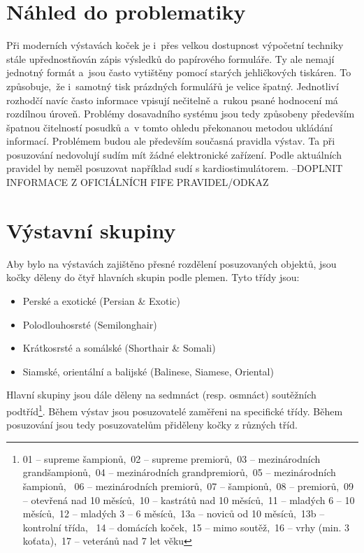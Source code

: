 \documentclass[11pt, oneside]{fithesis2}
\begin{document}
\section{Náhled do problematiky}
Při moderních výstavách koček je i~přes velkou dostupnost výpočetní techniky stále upřednostňován zápis výsledků do papírového formuláře.
Ty ale nemají jednotný formát a~jsou často vytištěny pomocí starých jehličkových tiskáren.
To způsobuje,~že i~samotný tisk prázdných formulářů je velice špatný. Jednotliví rozhodčí navíc často informace vpisují nečitelně a~rukou psané hodnocení má rozdílnou úroveň. Problémy dosavadního systému jsou tedy
způsobeny především špatnou čitelností posudků a~v tomto ohledu překonanou metodou ukládání informací.
\linebreak
Problémem budou ale především současná pravidla výstav. Ta při posuzování nedovolují sudím mít žádné elektronické zařízení. Podle aktuálních pravidel by neměl posuzovat například sudí s kardiostimulátorem. --DOPLNIT INFORMACE Z OFICIÁLNÍCH FIFE PRAVIDEL/ODKAZ

\section{Výstavní skupiny}
Aby bylo na výstavách zajištěno přesné rozdělení posuzovaných objektů, jsou kočky děleny do čtyř hlavních skupin podle plemen.
Tyto třídy jsou:
\begin{itemize}
 \item Perské a exotické (Persian \& Exotic)
 \item Polodlouhosrsté (Semilonghair)
 \item Krátkosrsté a somálské (Shorthair \& Somali)
 \item Siamské, orientální a balijské (Balinese, Siamese, Oriental)
\end{itemize}
Hlavní skupiny jsou dále děleny na sedmnáct (resp. osmnáct) soutěžních podtříd\footnote {01 -- supreme šampionů,~02 -- supreme premiorů,~03 -- mezinárodních grandšampionů,~04 -- mezinárodních grandpremiorů,~05 -- mezinárodních šampionů,
~06 -- mezinárodních premiorů,~07 -- šampionů,~08 -- premiorů,~09 -- otevřená nad 10 měsíců,~10 -- kastrátů nad 10 měsíců,~11 -- mladých 6 -- 10 měsíců,~12 -- mladých 3 -- 6 měsíců,~13a -- noviců od 10 měsíců,~13b -- kontrolní třída,
~14 -- domácích koček,~15 -- mimo soutěž,~16 -- vrhy (min. 3 koťata),~17 -- veteránů nad 7 let věku}. Během výstav jsou posuzovatelé zaměřeni na specifické třídy. Během posuzování jsou tedy posuzovatelům přiděleny kočky z různých tříd.
\end{document}
